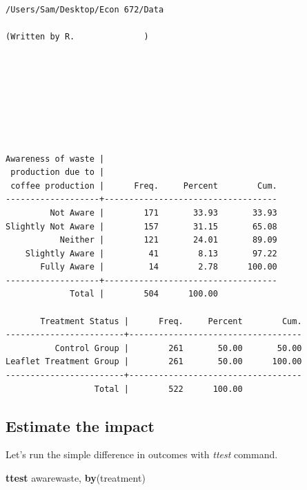 \documentclass[
]{book}
\newenvironment{Shaded}{\begin{snugshade}}{\end{snugshade}}
\newcommand{\KeywordTok}[1]{\textcolor[rgb]{0.13,0.29,0.53}{\textbf{#1}}}
\newcommand{\NormalTok}[1]{#1}
\begin{document}
\begin{verbatim}
/Users/Sam/Desktop/Econ 672/Data

(Written by R.              )








Awareness of waste |
 production due to |
 coffee production |      Freq.     Percent        Cum.
-------------------+-----------------------------------
         Not Aware |        171       33.93       33.93
Slightly Not Aware |        157       31.15       65.08
           Neither |        121       24.01       89.09
    Slightly Aware |         41        8.13       97.22
       Fully Aware |         14        2.78      100.00
-------------------+-----------------------------------
             Total |        504      100.00

       Treatment Status |      Freq.     Percent        Cum.
------------------------+-----------------------------------
          Control Group |        261       50.00       50.00
Leaflet Treatment Group |        261       50.00      100.00
------------------------+-----------------------------------
                  Total |        522      100.00
\end{verbatim}

\subsection{Estimate the impact}\label{estimate-the-impact-1}

Let's run the simple difference in outcomes with \emph{ttest} command.

\begin{Shaded}
\begin{Highlighting}[]
\KeywordTok{ttest}\NormalTok{ awarewaste, }\KeywordTok{by}\NormalTok{(treatment)}
\end{Highlighting}
\end{Shaded}
\end{document}

